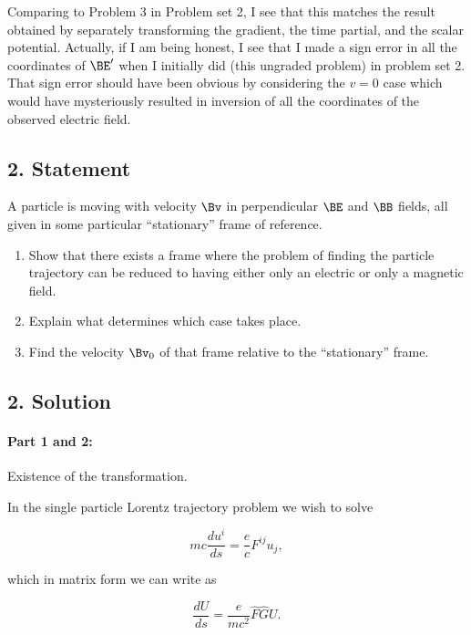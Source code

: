 Comparing to Problem 3 in Problem set 2, I see that this matches the result obtained by separately transforming the gradient, the time partial, and the scalar potential.  Actually, if I am being honest, I see that I made a sign error in all the coordinates of $\BE'$ when I initially did (this ungraded problem) in problem set 2.  That sign error should have been obvious by considering the $v=0$ case which would have mysteriously resulted in inversion of all the coordinates of the observed electric field.

\subsection{2. Statement}

A particle is moving with velocity $\Bv$ in perpendicular $\BE$ and $\BB$ fields, all given in some particular ``stationary'' frame of reference.

\begin{enumerate}
\item Show that there exists a frame where the problem of finding the particle trajectory can be reduced to having either only an electric or only a magnetic field.
\item Explain what determines which case takes place.
\item Find the velocity $\Bv_0$ of that frame relative to the ``stationary'' frame.
\end{enumerate}

\subsection{2. Solution}

\paragraph{Part 1 and 2:} Existence of the transformation.

In the single particle Lorentz trajectory problem we wish to solve 

\begin{equation}\label{eqn:relElectroDynProblemSet3:1500}
m c \frac{du^i}{ds} = \frac{e}{c} F^{i j} u_j,
\end{equation}

which in matrix form we can write as

\begin{equation}\label{eqn:relElectroDynProblemSet3:1520}
\frac{d U}{ds} = \frac{e}{m c^2} \hat{F} \hat{G} U.
\end{equation}

